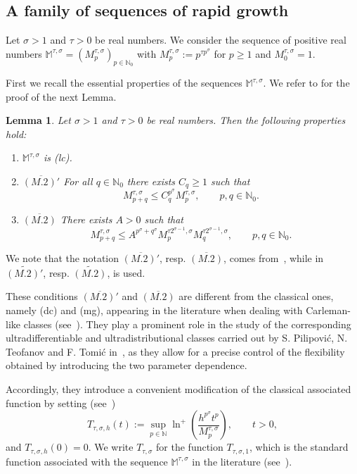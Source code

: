 \documentclass[12pt,leqno]{amsart}
\def\N{\mathbb{N}}
\theoremstyle{plain}
\newtheorem{lemma}[theo]{Lemma}
\theoremstyle{definition}
\numberwithin{equation}{section}
\def\M{\mathbb{M}}
\begin{document}
\subsection{A family of sequences of rapid growth}



Let $\sigma>1$ and $\tau>0$ be real numbers. We consider the sequence of positive real numbers $\mathbb{M}^{\tau,\sigma}=(M_p^{\tau,\sigma})_{p\in\N_0}$ with $M_p^{\tau,\sigma}:=p^{\tau p^{\sigma}}$ for $p\ge1$ and $M^{\tau,\sigma}_0=1$.

First we recall the essential properties of the sequences $\mathbb{M}^{\tau,\sigma}$.
We refer to \cite{ptt15} for the proof of the next Lemma.

\begin{lemma} Let  $\sigma>1$ and $\tau>0$ be real numbers. Then
the following properties hold:
 \begin{enumerate}
  \item[(i)] $\mathbb{M}^{\tau,\sigma}$ is (lc).
  \item[(ii)] $\overline{(M.2)'}$ For all $q\in\N_{0}$ there exists $C_q\geq 1$ such that
  $$M^{\tau,\sigma}_{p+q}\leq C_q^{p^\sigma} M^{\tau,\sigma}_{p},  \qquad p,q\in\N_{0}. $$
\item[(iii)]  $\overline{(M.2)}$ There exists $A>0$ such that
$$M^{\tau,\sigma}_{p+q}\le A^{p^\sigma +q^\sigma}M^{\tau 2^{\sigma-1},\sigma}_{p}M^{\tau 2^{\sigma-1},\sigma}_{q},\qquad p,q\in\N_0.$$
 \end{enumerate}
\end{lemma}



We note that the notation $\overline{(M.2)'}$, resp. $\overline{(M.2)}$, comes from~\cite{ptt}, while in~\cite{ptt15,ptt16,ptt21} $\widetilde{(M.2)'}$, resp. $\widetilde{(M.2)}$, is used.


These conditions $\overline{(M.2)'}$ and $\overline{(M.2)}$ are different from the classical ones, namely (dc) and (mg), appearing in the literature when dealing with Carleman-like classes (see~\cite{komatsu}). They play a prominent role in the study of the corresponding ultradifferentiable and ultradistributional classes carried out by S. Pilipovi{\'c}, N. Teofanov and F. Tomi{\'c} in~\cite{ptt15,ptt16,ptt,ptt21}, as they allow for a precise control of the flexibility obtained by introducing the two parameter dependence.

Accordingly, they introduce a convenient modification of the classical associated function by setting (see~\cite[Definition~2.1]{ptt})
$$T_{\tau,\sigma,h}(t):= \sup_{p\in\mathbb{N}} \ln^+\left(\frac{h^{p^{\sigma}}t^{p}}{M_{p}^{\tau,\sigma}}\right),\qquad t>0,$$
and $T_{\tau,\sigma,h}(0)=0$. We write $T_{\tau,\sigma}$ for the function $T_{\tau,\sigma,1}$, which is the standard function associated with the sequence $\M^{\tau,\sigma}$ in the literature (see~\cite[Definition~3.1]{komatsu}).
\end{document}
